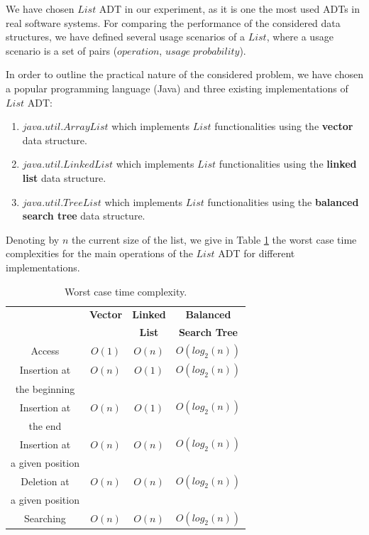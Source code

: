 We have chosen $List$ ADT in our experiment, as it is one the most used ADTs in real software systems. 
For comparing the performance of the considered data structures, we have defined several usage scenarios of a $List$, where a usage scenario is a set of pairs ($operation$, $usage\;probability$). 

In order to outline the practical nature of the considered problem, we have chosen a popular programming language (Java) and three existing implementations of $List$ ADT:

\begin{enumerate}

\item $java.util.ArrayList$ which implements $List$ functionalities using the \textbf{vector} data structure.

\item $java.util.LinkedList$ which implements $List$ functionalities using the \textbf{linked list} data structure.

\item $java.util.TreeList$ which implements $List$ functionalities using the \textbf{balanced search tree} data structure.

\end{enumerate}

Denoting by $n$ the current size of the list, we give in Table \ref{list} the worst case time complexities for the main operations of the $List$ ADT for different implementations.  

\begin{table}[t]
\centering
\begin{tabular}{|c|c|c|c|}
\hline
&\textbf{Vector}&\textbf{Linked}&\textbf{Balanced}\\
&&\textbf{List}&\textbf{Search Tree}\\
\hline
Access&$O(1)$&$O(n)$& $O(log_2(n))$\\
Insertion at&$O(n)$& $O(1)$ & $O(log_2(n))$\\
the beginning&&&\\
Insertion at&$O(n)$& $O(1)$ & $O(log_2(n))$\\
the end&&&\\
Insertion at& $O(n)$& $O(n)$ & $O(log_2(n))$\\
a given position&&&\\
Deletion at&$O(n)$& $O(n)$ & $O(log_2(n))$\\
a given position&&&\\
Searching&$O(n)$& $O(n)$ & $O(log_2(n))$\\
\hline
\end{tabular}
\caption{Worst case time complexity.}
\label{list}
\end{table}

